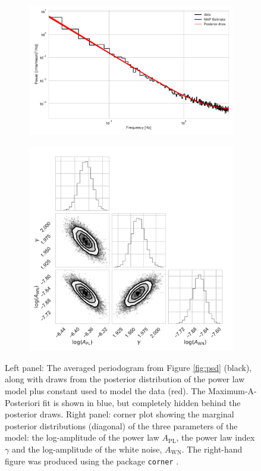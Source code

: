 \documentclass[12pt]{emulateapj}
\begin{document}
\begin{figure}[htbp]
\begin{center}
\begin{subfigure}[b]{10.5cm}
\includegraphics[width=\linewidth]{example_posterior.pdf}
\end{subfigure}
\begin{subfigure}[b]{6.8cm}
\includegraphics[width=\linewidth]{example_psd_corner.pdf}
\end{subfigure}
\caption{Left panel: The averaged periodogram from Figure \ref{fig:psd} (black), along with draws from the posterior distribution of the power law model plus constant used to model the data (red). The Maximum-A-Posteriori fit is shown in blue, but completely hidden behind the posterior draws. Right panel: corner plot showing the marginal posterior distributions (diagonal) of the three parameters of the model: the log-amplitude of the power law $A_\mathrm{PL}$, the power law index $\gamma$ and the log-amplitude of the white noise, $A_\mathrm{WN}$. The right-hand figure was produced using the package \texttt{corner} \citep{corner}.}
\label{fig:posterior}
\end{center}
\end{figure}
\end{document}
